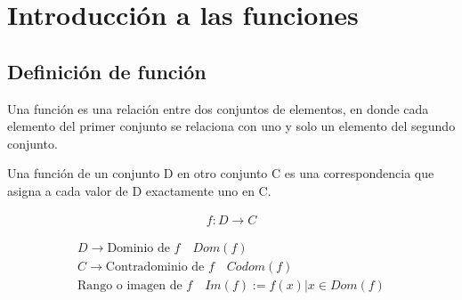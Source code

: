 \chapter{Introducción a las funciones}

\section{Definición de función}

Una función es una relación entre dos conjuntos de elementos, en donde cada
elemento del primer conjunto se relaciona con uno y solo un elemento del
segundo conjunto.

\begin{definition}
    Una función de un conjunto D en otro conjunto C es una correspondencia que asigna a cada valor de D exactamente uno en C.
\end{definition}

\begin{center}
\end{center}

\begin{align*}
    f : D \rightarrow C
\end{align*}

\begin{gather*}
    D \rightarrow \text{Dominio de } f \quad Dom(f) \\
    C \rightarrow \text{Contradominio de } f \quad Codom(f) \\
    \text{Rango o imagen de } f \quad Im(f) := {f(x) | x \in Dom(f)}
\end{gather*}

